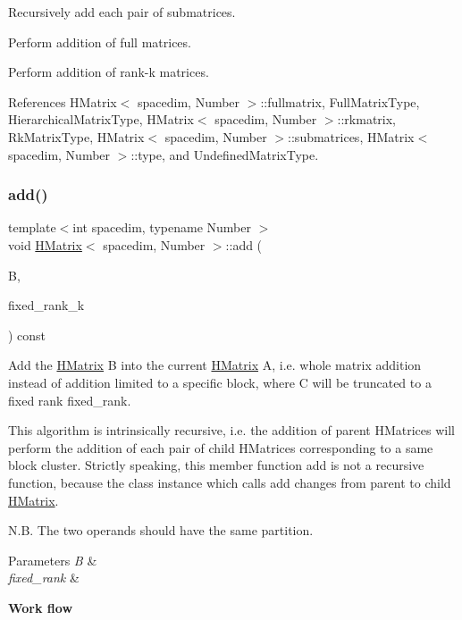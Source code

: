 Recursively add each pair of submatrices.

Perform addition of full matrices.

Perform addition of rank-\/k matrices.

References H\+Matrix$<$ spacedim, Number $>$\+::fullmatrix, Full\+Matrix\+Type, Hierarchical\+Matrix\+Type, H\+Matrix$<$ spacedim, Number $>$\+::rkmatrix, Rk\+Matrix\+Type, H\+Matrix$<$ spacedim, Number $>$\+::submatrices, H\+Matrix$<$ spacedim, Number $>$\+::type, and Undefined\+Matrix\+Type.

\mbox{\label{classHMatrix_a9bd48ada567962ab0dc75c31986bd1a6}} 
\subsubsection{\texorpdfstring{add()}{add()}\hspace{0.1cm}{\footnotesize\ttfamily [3/10]}}
{\footnotesize\ttfamily template$<$int spacedim, typename Number $>$ \\
void \hyperlink{classHMatrix}{H\+Matrix}$<$ spacedim, Number $>$\+::add (\begin{DoxyParamCaption}\item[{const \hyperlink{classHMatrix}{H\+Matrix}$<$ spacedim, Number $>$ \&}]{B,  }\item[{const \hyperlink{classHMatrix_a5ca8dc549783d38371a01ecd621ecb34}{size\+\_\+type}}]{fixed\+\_\+rank\+\_\+k }\end{DoxyParamCaption}) const}

Add the \hyperlink{classHMatrix}{H\+Matrix} {\ttfamily B} into the current \hyperlink{classHMatrix}{H\+Matrix} {\ttfamily A}, i.\+e. whole matrix addition instead of addition limited to a specific block, where {\ttfamily C} will be truncated to a fixed rank {\ttfamily fixed\+\_\+rank}.

This algorithm is intrinsically recursive, i.\+e. the addition of parent H\+Matrices will perform the addition of each pair of child H\+Matrices corresponding to a same block cluster. Strictly speaking, this member function {\ttfamily add} is not a recursive function, because the class instance which calls {\ttfamily add} changes from parent to child \hyperlink{classHMatrix}{H\+Matrix}.

N.\+B. The two operands should have the same partition.


\begin{DoxyParams}{Parameters}
{\em B} & \\
\hline
{\em fixed\+\_\+rank} & \\
\hline
\end{DoxyParams}
{\bfseries Work flow}

